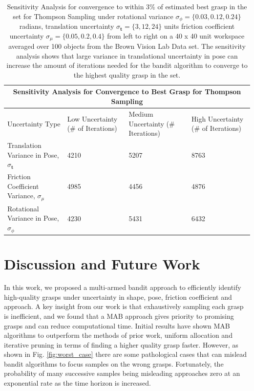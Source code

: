 \documentclass[10pt, conference]{ieeeconf}      %
\newcommand{\bt}{\mathbf{t}}
\begin{document}
\begin{table}[t]
\centering
\begin{tabular}{ |p{4.5cm}||p{2cm}|p{2.5cm}|p{2cm}|  }
 \hline
 \multicolumn{4}{|c|}{Sensitivity Analysis for Convergence to Best Grasp for Thompson Sampling} \\
 \hline
Uncertainty Type & Low Uncertainty ($\#$ of Iterations) & Medium Uncertainty ($\#$ Iterations) & High Uncertainty ($\#$ of Iterations)\\
 \hline
Translation Variance in Pose, $\sigma_{\bt}$ & 4210    & 5207 &  8763\\
Friction Coefficient Variance, $\sigma_{\mu}$ &  4985  & 4456   & 4876\\
Rotational Variance in Pose, $\sigma_{\phi}$ & 4230 & 5431 &  6432\\
 \hline
\end{tabular}
   \caption { \footnotesize  Sensitivity Analysis for convergence to within $3\%$ of estimated best grasp in the set for Thompson Sampling under rotational variance $\sigma_{\phi} = \lbrace 0.03,0.12, 0.24 \rbrace$ radians,  translation uncertainty $\sigma_{\bt} = \lbrace 3, 12, 24 \rbrace$ units  friction coefficient uncertainty $\sigma_{\mu} = \lbrace 0.05,0.2, 0.4 \rbrace$  from left to right on a 40 x 40 unit workspace averaged over 100 objects from the Brown Vision Lab Data set. The sensitivity analysis shows that large variance in translational uncertainty in pose can increase the amount of iterations needed for the bandit algorithm to converge to the highest quality grasp in the set. 
   }
\vspace*{-20pt}
\end{table}


\section{Discussion and Future Work } 

In this work, we proposed a multi-armed bandit approach to efficiently identify high-quality grasps under uncertainty in shape, pose, friction coefficient and approach. 
A key insight from our work is that exhaustively sampling each grasp is inefficient, and we found that a MAB approach gives priority to promising grasps and can reduce computational time. Initial results have shown MAB algorithms to outperform the methods of prior work, uniform allocation and iterative pruning  \cite{kehoe2012toward}\cite{kehoe2012estimating} in terms of finding a higher quality grasp faster.
However, as shown in Fig. \ref{fig:worst_case} there are some pathological cases that can mislead bandit algorithms to focus samples on the wrong grasps.
Fortunately, the probability of many successive samples being misleading approaches zero at an exponential rate as the time horizon is increased.
\end{document}
